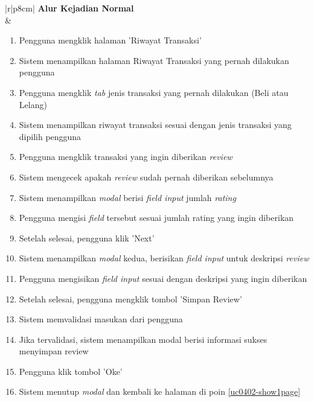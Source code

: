\begin{table}[H]
\begin{tabular}{|r|p{8cm}|}
			{\textbf{Alur Kejadian Normal}}                                                                            
			\\ \hline
			 & 
			\begin{enumerate}
				\item Pengguna mengklik halaman 'Riwayat Transaksi'
				\item Sistem menampilkan halaman Riwayat Transaksi yang pernah dilakukan pengguna
				\item Pengguna mengklik \textit{tab} jenis transaksi yang pernah dilakukan (Beli atau Lelang)
				\item \label{uc0402-show1page}Sistem menampilkan riwayat transaksi sesuai dengan jenis transaksi yang dipilih pengguna
				\item Pengguna mengklik transaksi yang ingin diberikan \textit{review}
				\item \label{al-0402-a}Sistem mengecek apakah \textit{review} sudah pernah diberikan sebelumnya
				\item Sistem menampilkan \textit{modal} berisi \textit{field input} jumlah \textit{rating}
				\item Pengguna mengisi \textit{field} tersebut sesuai jumlah rating yang ingin diberikan
				\item Setelah selesai, pengguna klik 'Next'
				\item Sistem menampilkan \textit{modal} kedua, berisikan \textit{field input} untuk deskripsi \textit{review}
				\item Pengguna mengisikan \textit{field input} sesuai dengan deskripsi yang ingin diberikan
				\item Setelah selesai, pengguna mengklik tombol 'Simpan Review'
				\item \label{al-0402-b}Sistem memvalidasi masukan dari pengguna
				\item Jika tervalidasi, sistem menampilkan modal berisi informasi sukses menyimpan review
				\item Pengguna klik tombol 'Oke'
				\item Sistem menutup \textit{modal} dan kembali ke halaman di poin \ref{uc0402-show1page}
				

\end{enumerate}
\end{tabular}
\end{table}
